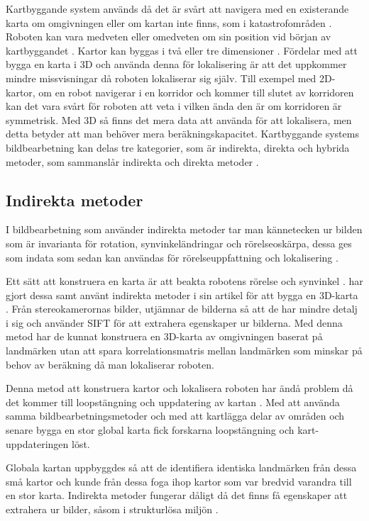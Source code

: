 Kartbyggande system används då det är svårt att navigera med en existerande karta om omgivningen eller om kartan inte finns, som i katastrofområden \citep{geospatial}. Roboten kan vara medveten eller omedveten om sin position vid början av kartbyggandet \citep{globalsubmaps}. Kartor kan byggas i två eller tre dimensioner \citep{ProbabilisticRobotics}. Fördelar med att bygga en karta i 3D och använda denna för lokalisering är att det uppkommer mindre missvisningar då roboten lokaliserar sig själv. Till exempel med 2D-kartor, om en robot navigerar i en korridor och kommer till slutet av korridoren kan det vara svårt för roboten att veta i vilken ända den är om korridoren är symmetrisk. Med 3D så finns det mera data att använda för att lokalisera, men detta betyder att man behöver mera beräkningskapacitet. Kartbyggande systems bildbearbetning kan delas tre kategorier, som är indirekta, direkta och hybrida metoder, som sammanslår indirekta och direkta metoder \citep{geospatial}.

\subsection{Indirekta metoder}

I bildbearbetning som använder indirekta metoder tar man kännetecken ur bilden som är invarianta för rotation, synvinkeländringar och rörelseoskärpa, dessa ges som indata som sedan kan användas för rörelseuppfattning och lokalisering \citep{geospatial}. 

Ett sätt att konstruera en karta är att beakta robotens rörelse och synvinkel \citep{globalsubmaps}. \cite{mapbuildingsift} har gjort dessa samt använt indirekta metoder i sin artikel  för att bygga en 3D-karta \citep{mapbuildingsift}. Från stereokamerornas bilder, utjämnar de bilderna så att de har mindre detalj i sig och använder SIFT för att extrahera egenskaper ur bilderna. Med denna metod har de kunnat konstruera en 3D-karta av omgivningen baserat på landmärken utan att spara korrelationsmatris mellan landmärken som minskar på behov av beräkning då man lokaliserar roboten. 

Denna metod att konstruera kartor och lokalisera roboten har ändå problem då det kommer till loopstängning och uppdatering av kartan \citep{globalsubmaps}. Med att använda samma bildbearbetningsmetoder och med att kartlägga delar av områden och senare bygga en stor global karta fick forskarna loopstängning och kart-uppdateringen löst. 

Globala kartan uppbyggdes så att de identifiera identiska landmärken från dessa små kartor och kunde från dessa foga ihop kartor som var bredvid varandra till en stor karta. Indirekta metoder fungerar dåligt då det finns få egenskaper att extrahera ur bilder, såsom i strukturlösa miljön \citep{geospatial}.

